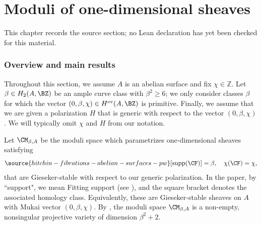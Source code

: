 \chapter{Moduli of one-dimensional sheaves}
\label{hitchin-fibrations-abelian-surfaces-pw-chapter-03}

\begin{remark}
\label{hitchin-fibrations-abelian-surfaces-pw-chapter-03-source}
This chapter records the source section; no Lean declaration has yet been checked for this material.
\notready
\end{remark}

\subsection{Overview and main results}\label{Sec2.1}
Throughout this section, we assume $A$ is an abelian surface and fix  $\chi \in \mathbb{Z}$.  Let $\beta \in H_2(A, \BZ)$ be an ample curve class with $\beta^2 \geq 6$; we only consider classes $\beta$ for which the vector $(0,\beta,\chi)\in H^{\mathrm{ev}}(A,\BZ)$ is primitive.
Finally, we assume that we are given a polarization $H$ that is generic with respect to the vector $(0, \beta, \chi)$.  We will typically omit $\chi$ and $H$ from our notation.

Let $\CM_{\beta,A}$ be the moduli space which parametrizes one-dimensional sheaves satisfying
\begin{equation}\label{given_d}
\source{hitchin-fibrations-abelian-surfaces-pw}
[\mathrm{supp}(\CF)]= \beta, \quad \chi(\CF) = \chi,
\end{equation}
that are Gieseker-stable with respect to our generic polarization. In the paper, by ``support", we mean Fitting support (see \cite{LP1}), and the square bracket denotes the associated homology class.
Equivalently, these are Gieseker-stable sheaves on $A$ with Mukai vector $(0, \beta, \chi)$.
By  \cite{Yo}, the moduli space $\CM_{\beta,A}$
 is a non-empty, nonsingular projective variety of dimension $\beta^2+2$.


